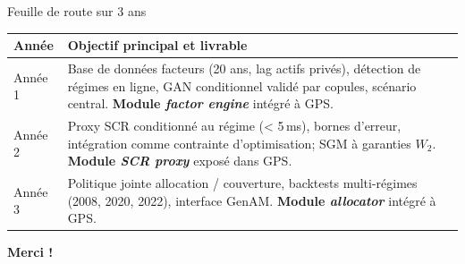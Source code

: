 \documentclass[aspectratio=169,11pt]{beamer}
\newcommand{\highlight}[1]{\textcolor{GeneraliRed}{\textbf{#1}}}
\begin{document}
\begin{frame}{Feuille de route sur 3 ans}
  \renewcommand{\arraystretch}{1.25}
  \begin{tabularx}{\textwidth}{>{\RaggedRight\arraybackslash}p{1.7cm}>{\RaggedRight\arraybackslash}X}
    \toprule
    \textbf{Année} & \textbf{Objectif principal et livrable} \\
    \midrule
    Année 1 & Base de données facteurs (20 ans, lag actifs privés), détection de régimes en ligne, GAN conditionnel validé par copules, scénario central. \highlight{Module \textit{factor engine}} intégré à GPS. \\
    Année 2 & Proxy SCR conditionné au régime (< 5\,ms), bornes d'erreur, intégration comme contrainte d'optimisation; SGM à garanties $W_2$. \highlight{Module \textit{SCR proxy}} exposé dans GPS. \\
    Année 3 & Politique jointe allocation / couverture, backtests multi-régimes (2008, 2020, 2022), interface GenAM. \highlight{Module \textit{allocator}} intégré à GPS. \\
    \bottomrule
  \end{tabularx}
\end{frame}

\begin{frame}{}
  \vfill
  \centering
  \Large \highlight{Merci !}
  \vfill
\end{frame}
\end{document}
